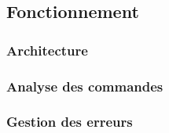 \documentclass{beamer}
\begin{document}
\subsection{Fonctionnement}

\begin{frame}
	\frametitle{Architecture}
\end{frame}

\begin{frame}
	\frametitle{Analyse des commandes}
	
\end{frame}

\begin{frame}
	\frametitle{Gestion des erreurs}
\end{frame}
\end{document}
